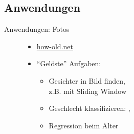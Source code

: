 \subsection{Anwendungen}
\begin{frame}{Anwendungen: Fotos}
    \begin{figure}[ht]
        \begin{minipage}[b]{0.45\linewidth}
            \begin{itemize}
                \item \href{https://how-old.net}{how-old.net}
                \item \enquote{Gelöste} Aufgaben:
                \begin{itemize}
                    \item Gesichter in Bild finden,\\
                          z.B. mit Sliding Window
                    \item Geschlecht klassifizieren: \male, \female
                    \item Regression beim Alter
                \end{itemize}
            \end{itemize}
            \vspace{2cm}
        \end{minipage}
        \hspace{0.5cm}
        \begin{minipage}[b]{0.45\linewidth}
            \centering
        \end{minipage}
    \end{figure}
\end{frame}

